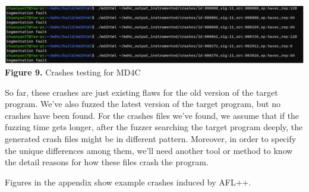 \documentclass[12pt]{diazessay}
\begin{document}
\vspace{6mm}
\begin{center}
	\includegraphics[scale=0.35, trim={0 0 1cm 0}, clip]{md4c_crashes.png}
	\textbf{Figure 9.} Crashes testing for MD4C
\end{center}
\vspace{3mm}

So far, these crashes are just existing flaws for the old version of the target program. We've also fuzzed the latest version of the target program, but no crashes have been found.
For the crashes files we've found, we assume that if the fuzzing time gets longer, after the fuzzer searching the target program deeply, the generated crash files might be in different pattern. Moreover, in order to specify the unique differences among them, we'll need another tool or method to know the detail reasons for how these files crash the program.

Figures in the appendix show example crashes induced by AFL++.
 
\end{document}
